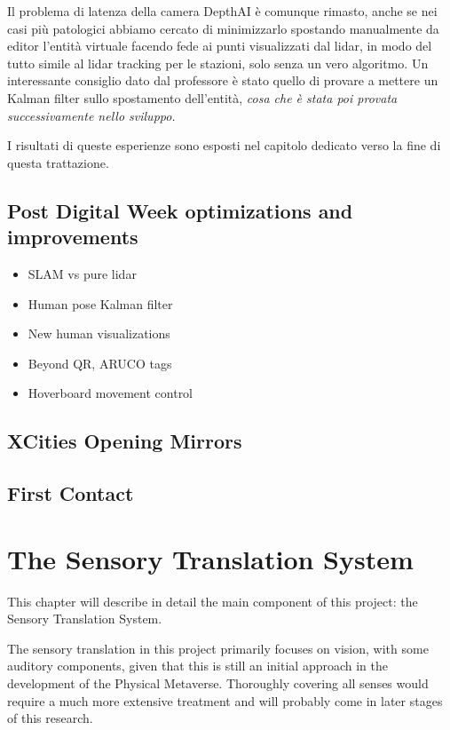 \documentclass{Configuration_Files/PoliMi3i_thesis}
\begin{document}
Il problema di latenza della camera DepthAI è comunque rimasto, anche se nei casi più patologici abbiamo cercato di minimizzarlo spostando manualmente da editor l’entità virtuale facendo fede ai punti visualizzati dal lidar, in modo del tutto simile al lidar tracking per le stazioni, solo senza un vero algoritmo. Un interessante consiglio dato dal professore è stato quello di provare a mettere un Kalman filter sullo spostamento dell’entità, \textit{cosa che è stata poi provata successivamente nello sviluppo.}

I risultati di queste esperienze sono esposti nel capitolo dedicato verso la fine di questa trattazione.

\section{Post Digital Week optimizations and improvements}

\begin{itemize}
    \item SLAM vs pure lidar
    \item Human pose Kalman filter
    \item New human visualizations
    \item Beyond QR, ARUCO tags
    \item Hoverboard movement control
\end{itemize}
 

\section{XCities Opening Mirrors}

\section{First Contact}

\chapter{The Sensory Translation System}

This chapter will describe in detail the main component of this project: the Sensory Translation System.

The sensory translation in this project primarily focuses on vision, with some auditory components, given that this is still an initial approach in the development of the Physical Metaverse. Thoroughly covering all senses would require a much more extensive treatment and will probably come in later stages of this research.
\end{document}
